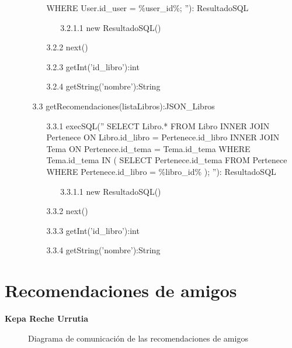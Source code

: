 ﻿\documentclass{report}
\begin{document}
\begin{enumerate}
\begin{enumerate}
\begin{enumerate}
                            WHERE User.id\_user = \%user\_id\%;
                            ''): ResultadoSQL
                        \begin{enumerate}
                            \item[3.2.1.1] new ResultadoSQL()
                        \end{enumerate}
                        \item[3.2.2] next()
                        \item[3.2.3] getInt('id\_libro'):int
                        \item[3.2.4] getString('nombre'):String
                    \end{enumerate}
                    \item[3.3] getRecomendaciones(listaLibros):JSON\_Libros
                    \begin{enumerate}
                        \item[3.3.1] execSQL(''
                            SELECT Libro.*
                            FROM Libro
                            INNER JOIN Pertenece ON Libro.id\_libro = Pertenece.id\_libro
                            INNER JOIN Tema ON Pertenece.id\_tema = Tema.id\_tema
                            WHERE Tema.id\_tema IN (
                                SELECT Pertenece.id\_tema
                                FROM Pertenece
                                WHERE Pertenece.id\_libro = \%libro\_id\%
                                );
                            ''): ResultadoSQL
                        \begin{enumerate}
                            \item[3.3.1.1] new ResultadoSQL()
                        \end{enumerate}
                        \item[3.3.2] next()
                        \item[3.3.3] getInt('id\_libro'):int
                        \item[3.3.4] getString('nombre'):String
                    \end{enumerate}
                \end{enumerate}
            \end{enumerate}
            \clearpage
        \section{Recomendaciones de amigos}
            \textbf{Kepa Reche Urrutia}
            \begin{figure}[H]
                \centering
                \caption{Diagrama de comunicación de las recomendaciones de amigos}
            \end{figure}
            \clearpage
\end{document}
